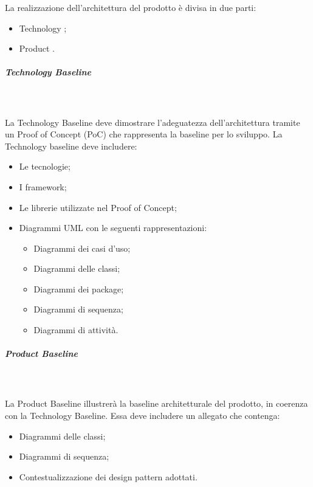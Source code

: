 La realizzazione dell’architettura del prodotto è divisa in due parti:
\begin{itemize}
	\item Technology ;
	\item Product .
\end{itemize}

\subparagraph{Technology Baseline}\mbox{}\\ \\
La Technology Baseline deve dimostrare l’adeguatezza dell’architettura tramite un Proof of Concept (PoC) che rappresenta la baseline per lo sviluppo. 
La Technology baseline deve includere:
\begin{itemize}
	\item Le tecnologie;
	\item I framework;
	\item Le librerie utilizzate nel Proof of Concept;
	\item Diagrammi UML con le seguenti rappresentazioni:
	\begin{itemize}
		\item Diagrammi dei casi d'uso; 
		\item Diagrammi delle classi; 
		\item Diagrammi dei package;
		\item Diagrammi di sequenza; 
		\item Diagrammi di attività.
	\end{itemize}
\end{itemize}

\subparagraph{Product Baseline}\mbox{}\\ \\
La Product Baseline illustrerà la baseline architetturale del prodotto, in coerenza con la Technology Baseline.
Essa deve includere un allegato che contenga:
\begin{itemize}
	\item Diagrammi delle classi;
	\item Diagrammi di sequenza;
	\item Contestualizzazione dei design pattern adottati.	
\end{itemize}